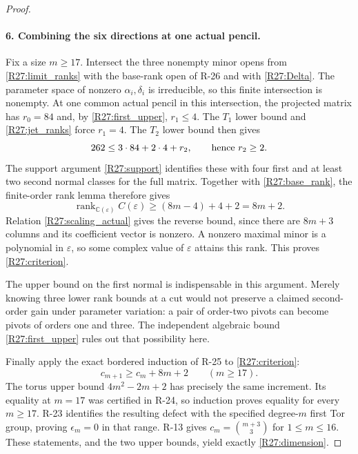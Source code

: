 \begin{proof}
\paragraph{6. Combining the six directions at one actual pencil.}
Fix a size $m\geq17$. Intersect the three nonempty minor opens
from \eqref{R27:limit_ranks} with the base-rank open of R-26
and with \eqref{R27:Delta}. The parameter space of nonzero
$\alpha_i,\delta_i$ is irreducible, so this finite intersection
is nonempty. At one common actual pencil in this intersection,
the projected matrix has $r_0=84$ and, by
\eqref{R27:first_upper}, $r_1\leq4$. The $T_1$ lower bound
and \eqref{R27:jet_ranks} force $r_1=4$.
The $T_2$ lower bound then gives
\[
 262\leq3\cdot84+2\cdot4+r_2,
 \qquad\hbox{hence }r_2\geq2.
\]
The support argument \eqref{R27:support} identifies these with
four first and at least two second normal classes for the full
matrix. Together with \eqref{R27:base_rank}, the finite-order
rank lemma therefore gives
\[
 \operatorname{rank}_{\mathbb C(\varepsilon)}C(\varepsilon)
       \geq(8m-4)+4+2=8m+2.
\]
Relation \eqref{R27:scaling_actual} gives the reverse bound,
since there are $8m+3$ columns and its coefficient vector is
nonzero. A nonzero maximal minor is a polynomial in
$\varepsilon$, so some complex value of $\varepsilon$ attains
this rank. This proves \eqref{R27:criterion}.

The upper bound on the first normal is indispensable in this
argument. Merely knowing three lower rank bounds at a cut
would not preserve a claimed second-order gain under parameter
variation: a pair of order-two pivots can become pivots of
orders one and three. The independent algebraic bound
\eqref{R27:first_upper} rules out that possibility here.

Finally apply the exact bordered induction of R-25 to
\eqref{R27:criterion}:
\[
 c_{m+1}\geq c_m+8m+2\qquad(m\geq17).
\]
The torus upper bound $4m^2-2m+2$ has precisely the same
increment. Its equality at $m=17$ was certified in R-24,
so induction proves equality for every $m\geq17$.
R-23 identifies the resulting defect with the specified
degree-$m$ first Tor group, proving $\epsilon_m=0$ in that
range. R-13 gives $c_m=\binom{m+3}{3}$ for $1\leq m\leq16$.
These statements, and the two upper bounds, yield exactly
\eqref{R27:dimension}.
\end{proof}
